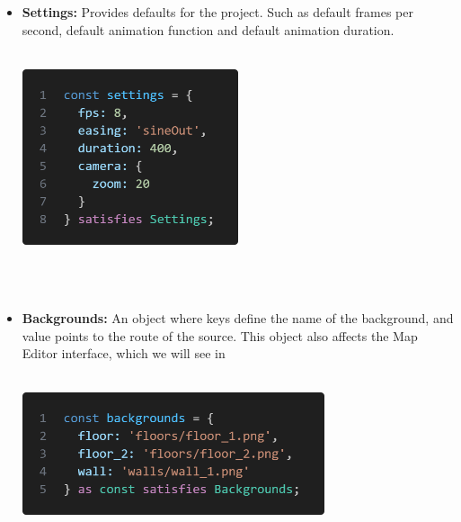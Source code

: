 \documentclass{article}
\begin{document}
\begin{itemize}
    \item \textbf{Settings:} Provides defaults for the project. Such as default frames per second, default animation function and default animation duration.\\\\
    \begin{minipage}{\linewidth}
        \centering
        \includegraphics[width=0.5\textwidth]{settings.png}
    \end{minipage}\\\\
    
    \item \textbf{Backgrounds:} An object where keys define the name of the background, and value points to the route of the source. This object also affects the Map Editor interface, which we will see in \\\\
    \begin{minipage}{\linewidth}
        \centering
        \includegraphics[width=0.7\textwidth]{backgrounds.png}
    \end{minipage}\\\\


\end{itemize}
\end{document}

